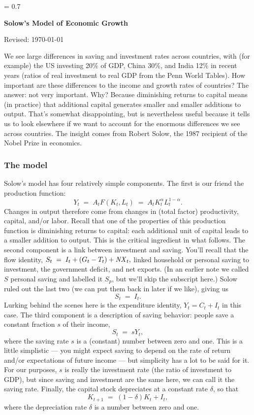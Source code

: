 \documentclass[letterpaper,12pt]{article}
\newcommand{\NX}{\mbox{\em NX\/}}
\begin{document}
\parskip = 0.7\bigskipamount 
\thispagestyle{empty}%
\Head

\centerline{\large \bf Solow's Model of Economic Growth}%
\centerline{Revised:  \today}

\bigskip
We see large differences in saving and investment rates across
countries, with (for example) the US investing 20\% of GDP,
China 30\%, and India 12\% in recent years
(ratios of real investment to real GDP from the Penn World Tables).
How important are these differences to the income and growth rates of countries?
The answer:  not very important.
Why?  Because diminishing returns to capital means
(in practice) that additional capital generates smaller and smaller
additions to output.
That's somewhat disappointing, but is nevertheless useful because it tells
us to look elsewhere if we want to account for the enormous differences
we see across countries.  
The insight comes from Robert Solow,
the 1987 recipient of the Nobel Prize in economics.


\subsubsection*{The model}
%
Solow's model has four relatively simple components.
The first is our friend the production function:
\begin{equation}
    Y_t \;=\; A_t F(K_t,L_t) \;=\; A_t K_t^{\alpha} L_t^{1-\alpha}.
        \label{eq:pf}
\end{equation}
Changes in output therefore come from changes in
(total factor) productivity, capital, and/or labor.
Recall that one of the properties of this production function
is diminishing returns to capital:
each additional unit of capital leads to a smaller addition to output.
This is the critical ingredient in what follows.
The second component is a link between investment and saving.
You'll recall that the flow identity,
$
    S_t \;=\; I_t + (G_t-T_t) + \NX_t ,
$
linked household or personal saving to 
investment, the government deficit, and net exports.
(In an earlier note we called $S$ personal saving
and labelled it $S_p$, but we'll skip the subscript here.)
Solow ruled out the last two (we can put them back in later if we like),
giving us
\[
    S_t \;=\; I_t.
\]
Lurking behind the scenes here is the expenditure identity,
$ Y_t = C_t + I_t$ in this case.
The third component is a description of saving behavior:
people save a constant fraction $s$ of their income,
\[
    S_t \;=\; s Y_t,
\]
where the saving rate $s$ is a (constant) number between zero and one.
This is a little simplistic ---
you might expect saving to depend on
the rate of return and/or expectations of future income ---
but simplicity has a lot to be said for it.
For our purposes, $s$ is really the investment rate (the ratio of
investment to GDP), but since saving and investment are the same
here, we can call it the saving rate.
Finally, the capital stock depreciates at a constant rate $\delta$,
so that
\[
    K_{t+1} \;=\; (1-\delta) K_t + I_t ,
\]
where the depreciation rate $\delta$ is a number between zero and one.
\end{document}
